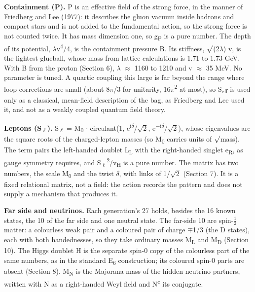 \documentclass[
  11pt,
]{article}
\begin{document}
\textbf{Containment (P).} P is an effective field of the strong force, in the manner of Friedberg and Lee (1977): it describes the gluon vacuum inside hadrons and compact stars and is not added to the fundamental action, so the strong force is not counted twice. It has mass dimension one, so g\textsubscript{P} is a pure number. The depth of its potential, \ensuremath{\lambda}v\textsuperscript{4}/4, is the containment pressure B. Its stiffness, \ensuremath{\surd}(2\ensuremath{\lambda}) v, is the lightest glueball, whose mass from lattice calculations is 1.71 to 1.73 GeV. With B from the proton (Section 6), \ensuremath{\lambda} \ensuremath{\approx} 1160 to 1210 and v \ensuremath{\approx} 35 MeV. No parameter is tuned. A quartic coupling this large is far beyond the range where loop corrections are small (about 8\ensuremath{\pi}/3 for unitarity, 16\ensuremath{\pi}\textsuperscript{2} at most), so S\textsubscript{eff} is used only as a classical, mean-field description of the bag, as Friedberg and Lee used it, and not as a weakly coupled quantum field theory.

\textbf{Leptons (S\textsubscript{\ensuremath{\ell}}).} S\textsubscript{\ensuremath{\ell}} = M\textsubscript{0} \ensuremath{\cdot} circulant(1, e\textsuperscript{i\ensuremath{\delta}}/\ensuremath{\sqrt{2}}, e\textsuperscript{\ensuremath{-}i\ensuremath{\delta}}/\ensuremath{\sqrt{2}}), whose eigenvalues are the square roots of the charged-lepton masses (so M\textsubscript{0} carries units of \ensuremath{\surd}mass). The term pairs the left-handed doublet L\textsubscript{L} with the right-handed singlet e\textsubscript{R}, as gauge symmetry requires, and S\textsubscript{\ensuremath{\ell}}\textsuperscript{2}/v\textsubscript{H} is a pure number. The matrix has two numbers, the scale M\textsubscript{0} and the twist \ensuremath{\delta}, with links of 1/\ensuremath{\sqrt{2}} (Section 7). It is a fixed relational matrix, not a field: the action records the pattern and does not supply a mechanism that produces it.

\textbf{Far side and neutrinos.} Each generation's 27 holds, besides the 16 known states, the 10 of the far side and one neutral state. The far-side 10 are spin-\ensuremath{\frac{1}{2}} matter: a colourless weak pair and a coloured pair of charge \ensuremath{\mp}1/3 (the D states), each with both handednesses, so they take ordinary masses M\textsubscript{L} and M\textsubscript{D} (Section 10). The Higgs doublet H is the separate spin-0 copy of the colourless part of the same numbers, as in the standard E\textsubscript{6} construction; its coloured spin-0 parts are absent (Section 8). M\textsubscript{N} is the Majorana mass of the hidden neutrino partners, written with N as a right-handed Weyl field and N\textsuperscript{c} its conjugate.
\end{document}
